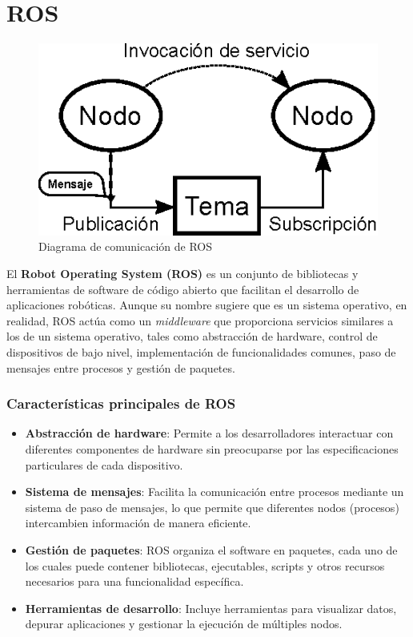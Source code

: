 \section{ROS} \label{sec:ros}

\begin{figure}[h]
	\centering
	\includegraphics[width=0.5\linewidth]{img/ROS_concepts}
	\caption{Diagrama de comunicación de ROS}
	\label{fig:rosconcepts}
\end{figure}

El \textbf{Robot Operating System (ROS)} es un conjunto de bibliotecas y herramientas de software de código abierto que facilitan el desarrollo de aplicaciones robóticas. Aunque su nombre sugiere que es un sistema operativo, en realidad, ROS actúa como un \textit{middleware} que proporciona servicios similares a los de un sistema operativo, tales como abstracción de hardware, control de dispositivos de bajo nivel, implementación de funcionalidades comunes, paso de mensajes entre procesos y gestión de paquetes. 

\subsubsection*{Características principales de ROS}

\begin{itemize}
	\item \textbf{Abstracción de hardware}: Permite a los desarrolladores interactuar con diferentes componentes de hardware sin preocuparse por las especificaciones particulares de cada dispositivo.
	\item \textbf{Sistema de mensajes}: Facilita la comunicación entre procesos mediante un sistema de paso de mensajes, lo que permite que diferentes nodos (procesos) intercambien información de manera eficiente.
	\item \textbf{Gestión de paquetes}: ROS organiza el software en paquetes, cada uno de los cuales puede contener bibliotecas, ejecutables, scripts y otros recursos necesarios para una funcionalidad específica.
	\item \textbf{Herramientas de desarrollo}: Incluye herramientas para visualizar datos, depurar aplicaciones y gestionar la ejecución de múltiples nodos.
\end{itemize}

